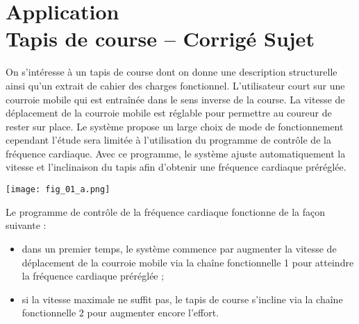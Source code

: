 \chapter*{Application  \\ 
Tapis de course -- \ifprof Corrigé \else Sujet \fi}

\iflivret {} \else
\ifprof  {} \else \fi
\fi

\setcounter{question}{0}

%



\ifprof\else
On s’intéresse à un tapis de course dont on
donne une description structurelle ainsi qu’un
extrait de cahier des charges fonctionnel.
L’utilisateur court sur une courroie mobile qui
est entraînée dans le sens inverse de la course.
La vitesse de déplacement de la courroie mobile
est réglable pour permettre au coureur de rester
sur place.
Le système propose un large choix de mode de
fonctionnement cependant l’étude sera limitée
à l’utilisation du programme de contrôle de la
fréquence cardiaque.
Avec ce programme, le système ajuste
automatiquement la vitesse et l’inclinaison du
tapis afin d’obtenir une fréquence cardiaque
préréglée.


\begin{marginfigure}[-1cm]
\texttt{[image: fig\_01\_a.png]}
\end{marginfigure}




Le programme de contrôle de la fréquence cardiaque fonctionne de la façon suivante :
\begin{itemize}
\item dans un premier temps, le système commence par augmenter la vitesse de déplacement de la courroie
mobile via la chaîne fonctionnelle 1 pour atteindre la fréquence cardiaque préréglée ;
\item si la vitesse maximale ne suffit pas, le tapis de course s’incline via la chaîne fonctionnelle 2 pour
augmenter encore l’effort.
\end{itemize}


